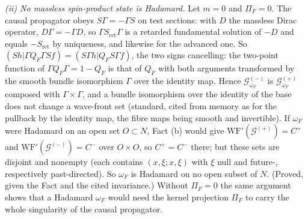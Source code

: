 \emph{(ii) No massless spin-product state is Hadamard.} Let $m = 0$ and $\Pi_{F} = 0$. The causal propagator obeys $S\Gamma = -\Gamma S$ on test sections: with $D$ the massless Dirac operator, $D\Gamma = -\Gamma D$, so $\Gamma S_{\mathrm{ret}}\Gamma$ is a retarded fundamental solution of $-D$ and equals $-S_{\mathrm{ret}}$ by uniqueness, and likewise for the advanced one. So $(Sh|\Gamma Q_{F}\Gamma Sf) = (S\Gamma h|Q_{F}S\Gamma f)$, the two signs cancelling: the two-point function of $\Gamma Q_{F}\Gamma = 1 - Q_{F}$ is that of $Q_{F}$ with both arguments transformed by the smooth bundle isomorphism $\Gamma$ over the identity map. Hence $\mathcal{G}^{(-)}_{\omega_{F}}$ is $\mathcal{G}^{(+)}_{\omega_{F}}$ composed with $\Gamma \times \Gamma$, and a bundle isomorphism over the identity of the base does not change a wave-front set (standard, cited from memory as \cite[Thm.~8.2.4]{Hormander1983} for the pullback by the identity map, the fibre maps being smooth and invertible). If $\omega_{F}$ were Hadamard on an open set $O \subset N$, Fact (b) would give $\mathrm{WF}'(\mathcal{G}^{(+)}) = C^{+}$ and $\mathrm{WF}'(\mathcal{G}^{(-)}) = C^{-}$ over $O \times O$, so $C^{+} = C^{-}$ there; but these sets are disjoint and nonempty (each contains $(x, \xi; x, \xi)$ with $\xi$ null and future-, respectively past-directed). So $\omega_{F}$ is Hadamard on no open subset of $N$. (Proved, given the Fact and the cited invariance.) Without $\Pi_{F} = 0$ the same argument shows that a Hadamard $\omega_{F}$ would need the kernel projection $\Pi_{F}$ to carry the whole singularity of the causal propagator.

